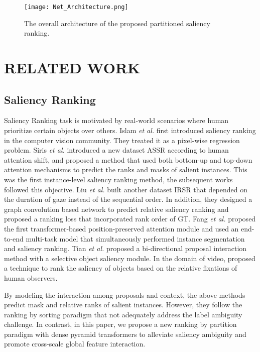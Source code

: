 \documentclass[sigconf]{acmart}
\def\ie{{\em i.e.}}
\def\etal{{\em et al.}}
\begin{document}
\begin{figure*}
	\begin{center}
		\texttt{[image: Net\_Architecture.png]}
		\caption{The overall architecture of  the proposed partitioned saliency ranking. 
}\label{fig:architecture}\end{center}
\end{figure*}
\section{RELATED WORK}

\subsection{Saliency Ranking}
Saliency Ranking task is motivated by real-world scenarios where human prioritize certain objects over others. Islam \etal{} \cite{islam2018revisiting} first introduced saliency ranking in the computer vision community. They treated it as a pixel-wise regression problem. Siris \etal{} \cite{siris2020inferring} introduced a new dataset ASSR according to human attention shift, and proposed a method that used both bottom-up and top-down attention mechanisms to predict the ranks and masks of salient instances. This was the first instance-level saliency ranking method, the subsequent works followed this objective. Liu \etal{} \cite{liu2021instance} built another dataset IRSR that depended on the duration of gaze instead of the sequential order. In addition, they designed a graph convolution based network to predict relative saliency ranking and proposed a ranking loss that incorporated rank order of GT. Fang \etal{} \cite{fang2021salient} proposed the first transformer-based position-preserved attention module and used an end-to-end multi-task model that simultaneously performed instance segmentation and saliency ranking. Tian \etal{} \cite{tian2022bi} proposed a bi-directional proposal interaction method with a selective object saliency module. In the domain of video, \cite{wang2019ranking} proposed a technique to rank the saliency of objects based on the relative fixations of human observers. 

By modeling the interaction among proposals and context, the above methods predict mask and relative ranks of salient instances. However, they follow the ranking by sorting paradigm that not adequately address the label ambiguity challenge. In contrast, in this paper, we propose a new ranking by partition paradigm with dense pyramid transformers to alleviate saliency ambiguity and promote cross-scale global feature interaction.
\end{document}
